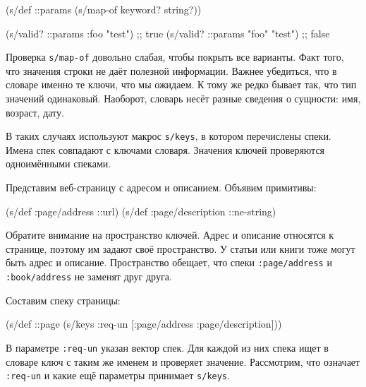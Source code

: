 \begin{english}
  \begin{clojure}
(s/def ::params
  (s/map-of keyword? string?))

(s/valid? ::params {:foo "test"})  ;; true
(s/valid? ::params {"foo" "test"}) ;; false
  \end{clojure}
\end{english}

Проверка \verb|s/map-of| довольно слабая, чтобы покрыть все варианты. Факт
того, что значения строки не даёт полезной информации. Важнее убедиться, что
в словаре именно те ключи, что мы ожидаем. К тому же редко бывает так, что тип
значений одинаковый. Наоборот, словарь несёт разные сведения о сущности:
имя, возраст, дату.


В таких случаях используют макрос \verb|s/keys|, в котором перечислены
спеки. Имена спек совпадают с ключами словаря. Значения ключей проверяются
одноимёнными спеками.

Представим веб-страницу с адресом и описанием. Объявим примитивы:

\begin{english}
  \begin{clojure}
(s/def :page/address ::url)
(s/def :page/description ::ne-string)
  \end{clojure}
\end{english}


Обратите внимание на пространство ключей. Адрес и описание относятся к странице,
поэтому им задают своё пространство. У статьи или книги тоже могут быть адрес и
описание. Пространство обещает, что спеки \verb|:page/address| и
\verb|:book/address| не заменят друг друга.

Составим спеку страницы:

\begin{english}
  \begin{clojure}
(s/def ::page
  (s/keys :req-un [:page/address
                   :page/description]))
  \end{clojure}
\end{english}


В параметре \verb|:req-un| указан вектор спек. Для каждой из них спека ищет в
словаре ключ с таким же именем и проверяет значение. Рассмотрим, что означает
\verb|:req-un| и какие ещё параметры принимает \verb|s/keys|.

